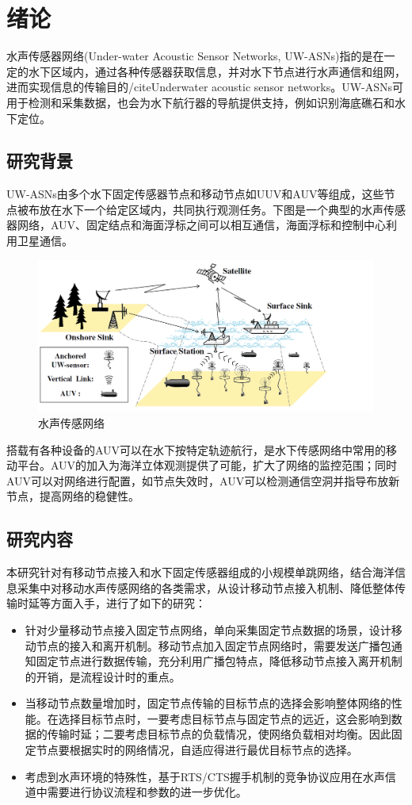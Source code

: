 \chapter{绪论}
水声传感器网络(Under-water Acoustic Sensor Networks, UW-ASNs)指的是在一定的水下区域内，通过各种传感器获取信息，并对水下节点进行水声通信和组网，进而实现信息的传输目的/cite{Underwater acoustic sensor networks}。UW-ASNs可用于检测和采集数据，也会为水下航行器的导航提供支持，例如识别海底礁石和水下定位。


\section{研究背景}
UW-ASNs由多个水下固定传感器节点和移动节点如UUV和AUV等组成，这些节点被布放在水下一个给定区域内，共同执行观测任务。下图是一个典型的水声传感器网络，AUV、固定结点和海面浮标之间可以相互通信，海面浮标和控制中心利用卫星通信。
\begin{figure}[ht]
	\centering
	\includegraphics[scale=0.8]{figures/1.png}
	\caption{
		水声传感网络
	}
	\label{fig:example}
\end{figure}

搭载有各种设备的AUV可以在水下按特定轨迹航行，是水下传感网络中常用的移动平台。AUV的加入为海洋立体观测提供了可能，扩大了网络的监控范围；同时AUV可以对网络进行配置，如节点失效时，AUV可以检测通信空洞并指导布放新节点，提高网络的稳健性。
\section{研究内容}
本研究针对有移动节点接入和水下固定传感器组成的小规模单跳网络，结合海洋信息采集中对移动水声传感网络的各类需求，从设计移动节点接入机制、降低整体传输时延等方面入手，进行了如下的研究：
\begin{itemize}
	\item 针对少量移动节点接入固定节点网络，单向采集固定节点数据的场景，设计移动节点的接入和离开机制。移动节点加入固定节点网络时，需要发送广播包通知固定节点进行数据传输，充分利用广播包特点，降低移动节点接入离开机制的开销，是流程设计时的重点。
	\item 当移动节点数量增加时，固定节点传输的目标节点的选择会影响整体网络的性能。在选择目标节点时，一要考虑目标节点与固定节点的远近，这会影响到数据的传输时延；二要考虑目标节点的负载情况，使网络负载相对均衡。因此固定节点要根据实时的网络情况，自适应得进行最优目标节点的选择。
	\item 考虑到水声环境的特殊性，基于RTS/CTS握手机制的竞争协议应用在水声信道中需要进行协议流程和参数的进一步优化。
\end{itemize}

